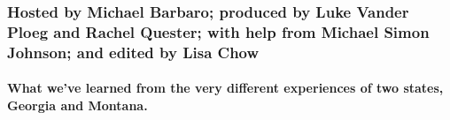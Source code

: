 \hypertarget{hosted-by-michael-barbaro-produced-by-luke-vander-ploeg-and-rachel-quester-with-help-from-michael-simon-johnson-and-edited-by-lisa-chow}{%
\subsubsection{Hosted by Michael Barbaro; produced by Luke Vander Ploeg
and Rachel Quester; with help from Michael Simon Johnson; and edited by
Lisa
Chow}\label{hosted-by-michael-barbaro-produced-by-luke-vander-ploeg-and-rachel-quester-with-help-from-michael-simon-johnson-and-edited-by-lisa-chow}}

\hypertarget{what-weve-learned-from-the-very-different-experiences-of-two-states-georgia-and-montana}{%
\paragraph{What we've learned from the very different experiences of two
states, Georgia and
Montana.}\label{what-weve-learned-from-the-very-different-experiences-of-two-states-georgia-and-montana}}


